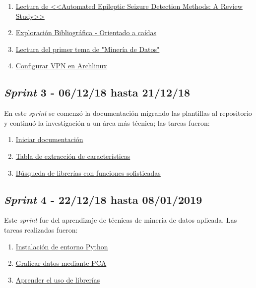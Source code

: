 \begin{enumerate}\addtocounter{enumi}{2}
	\item \href{https://github.com/joselucross/TFG-SmartBeds/issues/3}{Lectura de <<Automated Epileptic Seizure Detection Methods: A Review Study>>}
	\item \href{https://github.com/joselucross/TFG-SmartBeds/issues/4}{Exploración Bibliográfica - Orientado a caídas}
	\item \href{https://github.com/joselucross/TFG-SmartBeds/issues/5}{ Lectura del primer tema de "Minería de Datos"}
	\item \href{https://github.com/joselucross/TFG-SmartBeds/issues/6}{ Configurar VPN en Archlinux}
\end{enumerate}

\subsection{\textit{Sprint} 3 - 06/12/18 hasta 21/12/18}
En este \textit{sprint} se comenzó la documentación migrando las plantillas al repositorio y continuó la investigación a un área más técnica; las tareas fueron:

\begin{enumerate}\addtocounter{enumi}{6}
	\item \href{https://github.com/joselucross/TFG-SmartBeds/issues/7}{Iniciar documentación}
	\item \href{https://github.com/joselucross/TFG-SmartBeds/issues/8}{Tabla de extracción de características}
	\item \href{https://github.com/joselucross/TFG-SmartBeds/issues/9}{ Búsqueda de librerías con funciones sofisticadas}
	
\end{enumerate}

\subsection{\textit{Sprint} 4 - 22/12/18 hasta 08/01/2019}
Este \textit{sprint} fue del aprendizaje de técnicas de minería de datos aplicada. Las tareas realizadas fueron:

\begin{enumerate}\addtocounter{enumi}{9}
	\item \href{https://github.com/joselucross/TFG-SmartBeds/issues/10}{ Instalación de entorno Python}
	\item \href{https://github.com/joselucross/TFG-SmartBeds/issues/11}{ Graficar datos mediante PCA}
	\item \href{https://github.com/joselucross/TFG-SmartBeds/issues/12}{ Aprender el uso de librerías}
\end{enumerate}

